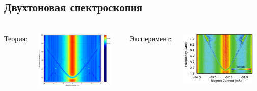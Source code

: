 \documentclass[aspectratio=169, 13pt]{beamer}
\begin{document}
\subsection{Двухтоновая спектроскопия}
\begin{frame}[c]\frametitle{\secname}\framesubtitle{\subsecname}
\begin{columns}[c]
\centering
Теория:

\vspace{1cm}
\includegraphics[width=0.9\textwidth]{two_tone}

\centering
Эксперимент:

\vspace{1cm}
\includegraphics[width=0.9\textwidth]{sin}

\end{columns}
\end{frame}
\end{document}
